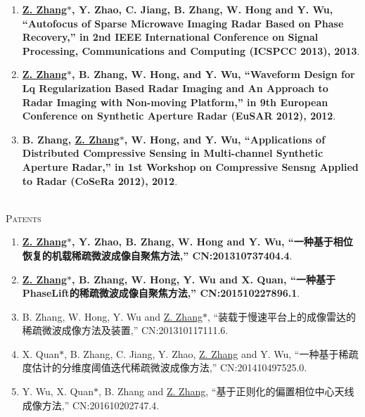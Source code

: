 \documentclass[paper=a4,fontsize=11pt]{scrartcl}
\begin{document}
\begin{enumerate}
\item \textbf{\underline{Z. Zhang$\ast$}, Y. Zhao, C. Jiang, B. Zhang, W. Hong and Y. Wu, ``Autofocus of Sparse Microwave Imaging Radar Based on Phase Recovery,'' in 2nd IEEE International Conference on Signal Processing, Communications and Computing (ICSPCC 2013), 2013}.

\item \textbf{\underline{Z. Zhang$\ast$}, B. Zhang, W. Hong, and Y. Wu, ``Waveform Design for Lq Regularization Based Radar Imaging and An Approach to Radar Imaging with Non-moving Platform,'' in 9th European Conference on Synthetic Aperture Radar (EuSAR 2012), 2012}.

\item \textbf{B. Zhang, \underline{Z. Zhang$\ast$}, W. Hong, and Y. Wu, ``Applications of Distributed Compressive Sensing in Multi-channel Synthetic Aperture Radar,'' in 1st Workshop on Compressive Sensng Applied to Radar (CoSeRa 2012), 2012}.

\end{enumerate}

~\\
\textsc{Patents}

\begin{enumerate}

\item \textbf{\underline{Z. Zhang$\ast$}, Y. Zhao, B. Zhang, W. Hong and Y. Wu, ``一种基于相位恢复的机载稀疏微波成像自聚焦方法,'' CN:201310737404.4}.

\item \textbf{\underline{Z. Zhang$\ast$}, B. Zhang, W. Hong, Y. Wu and X. Quan, ``一种基于PhaseLift的稀疏微波成像自聚焦方法,'' CN:201510227896.1}.

\item B. Zhang, W. Hong, Y. Wu and \underline{Z. Zhang$\ast$}, ``装载于慢速平台上的成像雷达的稀疏微波成像方法及装置,'' CN:201310117111.6.

\item X. Quan$\ast$, B. Zhang, C. Jiang, Y. Zhao, \underline{Z. Zhang} and Y. Wu, ``一种基于稀疏度估计的分维度阈值迭代稀疏微波成像方法,'' CN:201410497525.0.

\item Y. Wu, X. Quan$\ast$, B. Zhang and \underline{Z. Zhang}, ``基于正则化的偏置相位中心天线成像方法,'' CN:201610202747.4.

\end{enumerate}
\end{document}
